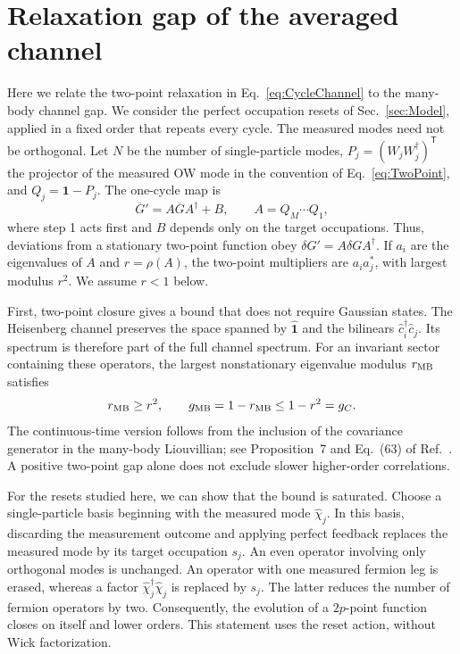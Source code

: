 \documentclass[aps,prb,10pt,twocolumn,superscriptaddress,longbibliography,floatfix]{revtex4-2}
\begin{document}
{\color{blue}
\section{Relaxation gap of the averaged channel}
\label{app:ChannelGap}

Here we relate the two-point relaxation in Eq.~\eqref{eq:CycleChannel} to the many-body channel gap. We consider the perfect occupation resets of Sec.~\ref{sec:Model}, applied in a fixed order that repeats every cycle. The measured modes need not be orthogonal. Let $N$ be the number of single-particle modes, $P_j=(W_jW_j^\dagger)^{\mathsf T}$ the projector of the measured OW mode in the convention of Eq.~\eqref{eq:TwoPoint}, and $Q_j=\mathbf{1}-P_j$. The one-cycle map is
\begin{equation}
    \overline G'=A\overline GA^\dagger+B,
    \qquad A=Q_M\cdots Q_1,
    \label{eq:AppCycleChannel}
\end{equation}
where step 1 acts first and $B$ depends only on the target occupations. Thus, deviations from a stationary two-point function obey $\delta G'=A\delta GA^\dagger$. If $a_i$ are the eigenvalues of $A$ and $r=\rho(A)$, the two-point multipliers are $a_i a_j^*$, with largest modulus $r^2$. We assume $r<1$ below.

First, two-point closure gives a bound that does not require Gaussian states. The Heisenberg channel preserves the space spanned by $\hat{\mathbf{1}}$ and the bilinears $\hat c_i^\dagger\hat c_j$. Its spectrum is therefore part of the full channel spectrum. For an invariant sector containing these operators, the largest nonstationary eigenvalue modulus $r_{\rm MB}$ satisfies
\begin{equation}
    r_{\rm MB}\geq r^2,
    \qquad g_{\rm MB}=1-r_{\rm MB}\leq 1-r^2=g_C.
    \label{eq:ChannelGapBound}
\end{equation}
The continuous-time version follows from the inclusion of the covariance generator in the many-body Liouvillian; see Proposition~7 and Eq.~(63) of Ref.~\cite{BarthelZhang2022}. A positive two-point gap alone does not exclude slower higher-order correlations.

For the resets studied here, we can show that the bound is saturated. Choose a single-particle basis beginning with the measured mode $\hat\chi_j$. In this basis, discarding the measurement outcome and applying perfect feedback replaces the measured mode by its target occupation $s_j$. An even operator involving only orthogonal modes is unchanged. An operator with one measured fermion leg is erased, whereas a factor $\hat\chi_j^\dagger\hat\chi_j$ is replaced by $s_j$. The latter reduces the number of fermion operators by two. Consequently, the evolution of a $2p$-point function closes on itself and lower orders. This statement uses the reset action, without Wick factorization.

}
\end{document}
